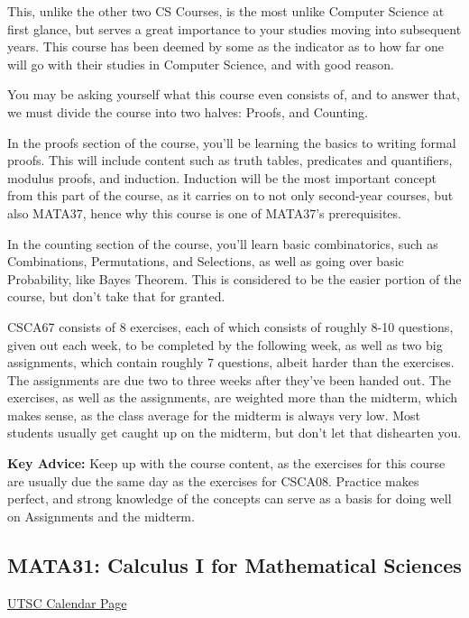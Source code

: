 \documentclass[11pt]{article}
\begin{document}
This, unlike the other two CS Courses, is the most unlike Computer Science at first glance, but serves a great importance to your studies moving into subsequent years.  This course has been deemed by some as the indicator as to how far one will go with their studies in Computer Science, and with good reason.\par
You may be asking yourself what this course even consists of, and to answer that, we must divide the course into two halves: Proofs, and Counting.\par
In the proofs section of the course, you'll be learning the basics to writing formal proofs.  This will include content such as truth tables, predicates and quantifiers, modulus proofs, and induction.  Induction will be the most important concept from this part of the course, as it carries on to not only second-year courses, but also MATA37, hence why this course is one of MATA37's prerequisites. \par
In the counting section of the course, you'll learn basic combinatorics, such as Combinations, Permutations, and Selections, as well as going over basic Probability, like Bayes Theorem.  This is considered to be the easier portion of the course, but don't take that for granted. \par
CSCA67 consists of 8 exercises, each of which consists of roughly 8-10 questions, given out each week, to be completed by the following week, as well as two big assignments, which contain roughly 7 questions, albeit harder than the exercises.  The assignments are due two to three weeks after they've been handed out.  The exercises, as well as the assignments, are weighted more than the midterm, which makes sense, as the class average for the midterm is always very low.  Most students usually get caught up on the midterm, but don't let that dishearten you.\par
\textbf{Key Advice:} Keep up with the course content, as the exercises for this course are usually due the same day as the exercises for CSCA08.  Practice makes perfect, and strong knowledge of the concepts can serve as a basis for doing well on Assignments and the midterm.

\subsection{MATA31: Calculus I for Mathematical Sciences}

\href{https://utsc.calendar.utoronto.ca/course/MATA31H3}{UTSC Calendar Page}\\
\end{document}

